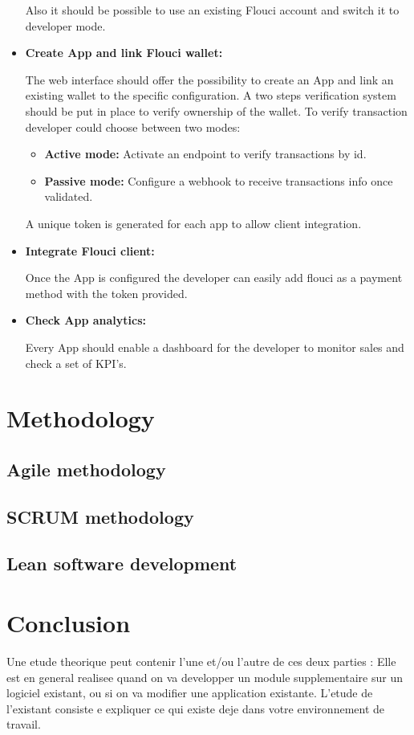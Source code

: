 \begin{spacing}{1.2}
\begin{itemize}
  Also it should be possible to use an existing Flouci account and switch it to developer mode.
   
  \item \textbf{Create App and link Flouci wallet:}

  The web interface should offer the possibility to create an App and link an existing wallet to the specific configuration. A two steps verification system should be put in place to verify ownership of the wallet.
  To verify transaction developer could choose between two modes:
  \begin{itemize}
  \item \textbf{Active mode:} Activate an endpoint to verify transactions by id.
  \item \textbf{Passive mode:} Configure a webhook to receive transactions info once validated.
   \end{itemize}
   A unique token is generated for each app to allow client integration.
  \item \textbf{Integrate Flouci client:}
 
 Once the App is configured the developer can easily add flouci as a payment method with the token provided.
  \item \textbf{Check App analytics:}
  
  Every App should enable a dashboard for the developer to monitor sales and check a set of KPI's.
\end{itemize}
\section{Methodology}
\subsection{Agile methodology}
\subsection{SCRUM methodology}
\subsection{Lean software development}
\section*{Conclusion}


Une etude theorique \cite{YOUSFI2015} peut contenir l'une et/ou l'autre de ces deux parties :
Elle est en general realisee quand on va developper un module supplementaire sur un 
logiciel existant, ou si on va modifier une application existante. L'etude de l'existant
consiste e expliquer ce qui existe deje dans votre environnement de travail.



\end{spacing}
